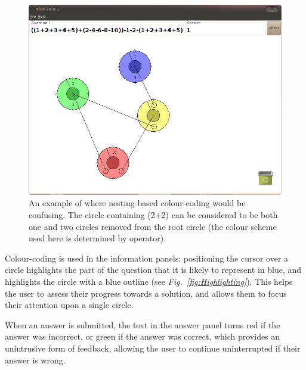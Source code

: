 \documentclass[12pt,twoside,notitlepage,xetex]{report}
\begin{document}
\begin{center}
\begin{figure}[H]
\begin{center}
\includegraphics[width=\textwidth-2cm]{figs/nico_screen_02.png}
\end{center}
\caption{An example of where nesting-based colour-coding would be confusing.  The circle containing (2+2) can be considered to be both one and two circles removed from the root circle (the colour scheme used here is determined by operator).}
\label{fig:Nico2}
\end{figure}
\end{center}

Colour-coding is used in the information panels: positioning the cursor over a circle highlights the part of the question that it is likely to represent in blue, and highlights the circle with a blue outline (see \emph{Fig.~\ref{fig:Highlighting}}).  This helps the user to assess their progress towards a solution, and allows them to focus their attention upon a single circle.

When an answer is submitted, the text in the answer panel turns red if the answer was incorrect, or green if the answer was correct, which provides an unintrusive form of feedback, allowing the user to continue uninterrupted if their answer is wrong.
\end{document}
